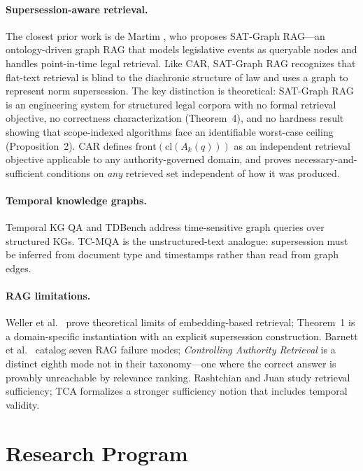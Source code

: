 \documentclass[11pt]{article}
\begin{document}
\paragraph{Supersession-aware retrieval.} The closest prior work is de Martim \cite{demartim2025satgraphrag}, who proposes SAT-Graph RAG---an ontology-driven graph RAG that models legislative events as queryable nodes and handles point-in-time legal retrieval. Like CAR, SAT-Graph RAG recognizes that flat-text retrieval is blind to the diachronic structure of law and uses a graph to represent norm supersession. The key distinction is theoretical: SAT-Graph RAG is an engineering system for structured legal corpora with no formal retrieval objective, no correctness characterization (Theorem~4), and no hardness result showing that scope-indexed algorithms face an identifiable worst-case ceiling (Proposition~2). CAR defines $\mathrm{front}(\mathrm{cl}(A_k(q)))$ as an independent retrieval objective applicable to any authority-governed domain, and proves necessary-and-sufficient conditions on \emph{any} retrieved set independent of how it was produced.

\paragraph{Temporal knowledge graphs.} Temporal KG QA \cite{su2024tkgqa} and TDBench \cite{tdbench2026} address time-sensitive graph queries over structured KGs. TC-MQA is the unstructured-text analogue: supersession must be inferred from document type and timestamps rather than read from graph edges.

\paragraph{RAG limitations.} Weller et al.\ \cite{weller2025embedding} prove theoretical limits of embedding-based retrieval; Theorem~1 is a domain-specific instantiation with an explicit supersession construction. Barnett et al.\ \cite{barnett2024seven} catalog seven RAG failure modes; \emph{Controlling Authority Retrieval} is a distinct eighth mode not in their taxonomy---one where the correct answer is provably unreachable by relevance ranking. Rashtchian and Juan \cite{rashtchian2025sufficient} study retrieval sufficiency; TCA formalizes a stronger sufficiency notion that includes temporal validity.

\section{Research Program}
\label{sec:research}
\end{document}
